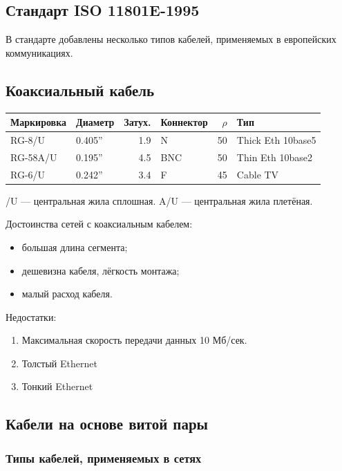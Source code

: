 \documentclass[12pt, russian, oneside, article]{ncc}
\begin{document}
\subsection{Стандарт ISO 11801E-1995}
\label{sec-4_3}


В стандарте добавлены несколько типов кабелей, применяемых в европейских коммуникациях.
\subsection{Коаксиальный кабель}
\label{sec-4_4}



\begin{center}
\begin{tabular}{llrlrl}
 Маркировка  &  Диаметр  &  Затух.  &  Коннектор  &  $\rho$  &  Тип                \\
\hline
 RG-8/U      &  0.405''  &     1.9  &  N          &      50  &  Thick Eth 10base5  \\
 RG-58A/U    &  0.195''  &     4.5  &  BNC        &      50  &  Thin Eth 10base2   \\
 RG-6/U      &  0.242''  &     3.4  &  F          &      45  &  Cable TV           \\
\end{tabular}
\end{center}



/U --- центральная жила сплошная.
A/U --- центральная жила плетёная.

Достоинства сетей с коаксиальным кабелем:
\begin{itemize}
\item большая длина сегмента;
\item дешевизна кабеля, лёгкость монтажа;
\item малый расход кабеля.
\end{itemize}

Недостатки:
\begin{enumerate}
\item Максимальная скорость передачи данных 10 Мб/сек.
\item Толстый Ethernet
\item Тонкий Ethernet
\end{enumerate}
\subsection{Кабели на основе витой пары}
\label{sec-4_5}
\subsubsection{Типы кабелей, применяемых в сетях}
\label{sec-4_5_1}
\end{document}
